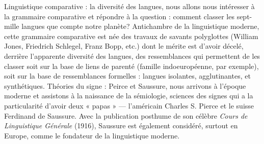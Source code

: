 Linguistique comparative : la diversité des langues, nous allons nous intéresser à la grammaire comparative et répondre à la question : comment classer les sept-mille langues que compte notre planète? Antichambre de la linguistique moderne, cette grammaire comparative est née des travaux de savants polyglottes (William Jones, Friedrich Schlegel, Franz Bopp, etc.) dont le mérite est d’avoir décelé, derrière l’apparente diversité des langues, des ressemblances qui permettent de les classer soit sur la base de liens de parenté (famille indoeuropéenne, par exemple), soit sur la base de ressemblances formelles : langues isolantes, agglutinantes, et synthétiques.
Théories du signe : Peirce et Saussure, nous arrivons à l’époque moderne et assistons à la naissance de la sémiologie, sciences des signes qui a la particularité d’avoir deux « papas » — l’américain Charles S. Pierce et le suisse Ferdinand de Saussure. Avec la publication posthume de son célèbre \textit{Cours de Linguistique Générale} (1916), Saussure est également considéré, surtout en Europe, comme le fondateur de la linguistique moderne.
